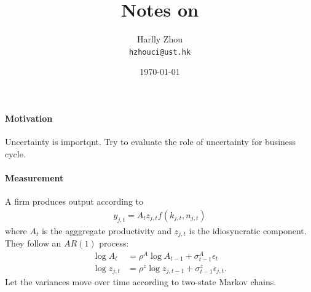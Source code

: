 \documentclass[12pt]{article}
\title{Notes on \cite{bloomReallyUncertainBusiness2018}}
\author{Harlly Zhou \\ \texttt{hzhouci@ust.hk}}
\date{\today}
\numberwithin{equation}{section}
\begin{document}
\maketitle

\paragraph{Motivation} Uncertainty is importqnt. Try to evaluate the role of uncertainty for business cycle.

\paragraph{Measurement} A firm produces output according to
\begin{align*}
    y_{j,t} = A_t z_{j,t} f(k_{j,t}, n_{j,t})
\end{align*}
where $A_t$ is the agggregate productivity and $z_{j,t}$ is the idiosyncratic component. They follow an $AR(1)$ process:
\begin{align*}
    \log A_t &= \rho^A \log A_{t-1} + \sigma_{t-1}^A \epsilon_t\\
    \log z_{j,t} &= \rho^z \log z_{j,t-1} + \sigma_{t-1}^z \epsilon_{j,t}.
\end{align*}
Let the variances move over time according to two-state Markov chains.
\end{document}
